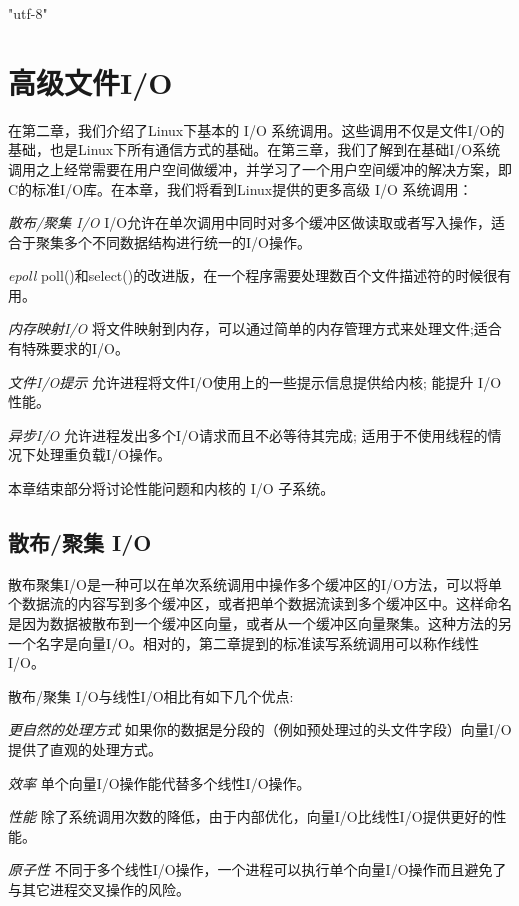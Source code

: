 \ifx\atempxetex\usewhat
\XeTeXinputencoding "utf-8"
\fi
{}

 \chapter{高级文件I/O}

在第二章，我们介绍了Linux下基本的 I/O 系统调用。这些调用不仅是文件I/O的基础，也是Linux下所有通信方式的基础。在第三章，我们了解到在基础I/O系统调用之上经常需要在用户空间做缓冲，并学习了一个用户空间缓冲的解决方案，即C的标准I/O库。在本章，我们将看到Linux提供的更多高级 I/O 系统调用：

\begin{eqlist*}
\item[\emph{散布/聚集 I/O}] I/O允许在单次调用中同时对多个缓冲区做读取或者写入操作，适合于聚集多个不同数据结构进行统一的I/O操作。
\item[\emph{epoll}] poll()和select()的改进版，在一个程序需要处理数百个文件描述符的时候很有用。
\item[\emph{内存映射I/O}] 将文件映射到内存，可以通过简单的内存管理方式来处理文件;适合有特殊要求的I/O。
\item[\emph{文件I/O提示}] 允许进程将文件I/O使用上的一些提示信息提供给内核; 能提升 I/O 性能。
\item[\emph{异步I/O}] 允许进程发出多个I/O请求而且不必等待其完成; 适用于不使用线程的情况下处理重负载I/O操作。
\end{eqlist*}

本章结束部分将讨论性能问题和内核的 I/O 子系统。

\section{散布/聚集 I/O}

散布聚集I/O是一种可以在单次系统调用中操作多个缓冲区的I/O方法，可以将单个数据流的内容写到多个缓冲区，或者把单个数据流读到多个缓冲区中。这样命名是因为数据被散布到一个缓冲区向量，或者从一个缓冲区向量聚集。这种方法的另一个名字是向量I/O。相对的，第二章提到的标准读写系统调用可以称作线性I/O。

散布/聚集 I/O与线性I/O相比有如下几个优点:

\begin{eqlist*}
\item[\emph{更自然的处理方式}] 如果你的数据是分段的（例如预处理过的头文件字段）向量I/O提供了直观的处理方式。
\item[\emph{效率}] 单个向量I/O操作能代替多个线性I/O操作。
\item[\emph{性能}] 除了系统调用次数的降低，由于内部优化，向量I/O比线性I/O提供更好的性能。
\item[\emph{原子性}] 不同于多个线性I/O操作，一个进程可以执行单个向量I/O操作而且避免了与其它进程交叉操作的风险。
\end{eqlist*}


